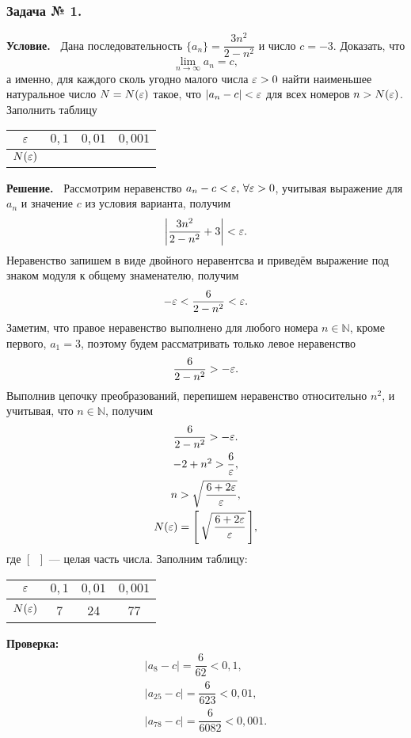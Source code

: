 \subsubsection*{\center Задача № 1.}
{\bf Условие.~}
Дана последовательность $\{a_n\} = \dfrac{3n^2}{2-n^2}$ и число $c=-3$. Доказать, что 
$$\lim\limits_{n\rightarrow\infty}a_n=c,$$
а именно, для каждого сколь угодно малого числа $\varepsilon>0$ найти наименьшее натуральное число 
$N=N(\varepsilon)$ такое, что $|a_n-c|<\varepsilon$ для всех номеров $n>N(\varepsilon)$.
Заполнить таблицу
\begin{center}
	\begin{tabular}{|c|c|c|c|}
		\hline
		$\varepsilon$ &  $0{,}1$ & $0{,}01$ & $0{,}001$ \\
		\hline
		$N(\varepsilon)$ & & & \\
		\hline
	\end{tabular}
\end{center}
{\bf Решение.~}	
Рассмотрим неравенство $a_n-c<\varepsilon,\,\forall\varepsilon>0$, учитывая выражение для $a_n$ и значение $c$ из условия варианта,
получим
$$
\biggl|\frac{3n^2}{2-n^2}+3\biggr| < \varepsilon.
$$
Неравенство запишем в виде двойного неравентсва и приведём выражение под знаком модуля к общему знаменателю,
получим
$$
-\varepsilon < \frac{6}{2-n^2} < \varepsilon.
$$
Заметим, что правое неравенство выполнено для любого номера $n\in\mathbb{N}$, кроме первого, $a_1=3$, поэтому будем рассматривать только левое неравенство 
$$
\frac{6}{2-n^2} > -\varepsilon.
$$
Выполнив цепочку преобразований, перепишем неравенство относительно $n^2$, и учитывая, что $n\in\mathbb{N}$, получим
$$
\begin{array}{c}
\dfrac{6}{2-n^2} > -\varepsilon. 							\\[8pt]
-2+n^2 > \dfrac{6}{\varepsilon}, 							\\[8pt]
n > \sqrt{\,\dfrac{6+2\varepsilon}{\varepsilon}}, 		\\[8pt]
N(\varepsilon) = \Biggl[\,\sqrt{\,\dfrac{6+2\varepsilon}{\varepsilon}}\,\Biggr],
\end{array}
$$
где $[\phantom{a}]$ --- целая часть числа.
Заполним таблицу:
\begin{center}
	\begin{tabular}{|c|c|c|c|}
		\hline
		$\varepsilon$ &  $0{,}1$ & $0{,}01$ & $0{,}001$ \\
		\hline
		$N(\varepsilon)$ & 7 & 24 & 77 \\
		\hline
	\end{tabular}
\end{center}
\textbf{Проверка:}
$$
\begin{array}{l}
|a_8 - c| = \dfrac{6}{62} < 0{,}1,			\\[10pt]
|a_{25} - c| = \dfrac{6}{623} < 0{,}01,	\\[10pt]
|a_{78} - c| = \dfrac{6}{6082} < 0{,}001.
\end{array}
$$


